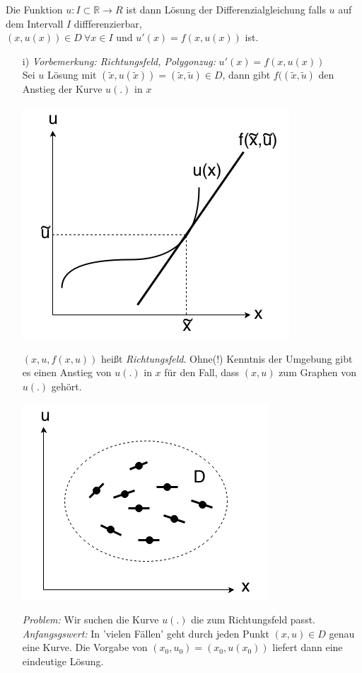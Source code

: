 Die Funktion $u: I \subset \mathbb{R} \rightarrow R $ ist dann Lösung der Differenzialgleichung falls
$u$ auf dem Intervall $I$ diffferenzierbar,\\
$(x, u(x)) \in D \ \forall x \in I $ und $u'(x) = f(x, u(x)) $ ist.\newpage
\begin{enumerate}
    \item[i)] \emph{Vorbemerkung: Richtungsfeld, Polygonzug:} $u'(x) = f(x, u(x))$\\
        Sei $u$ Lösung mit $(\tilde{x}, u(\tilde{x})) = (\tilde{x}, \tilde{u}) \in D$, dann gibt $f((\tilde{x}, \tilde{u}) $ den Anstieg der Kurve $u(.) $ in $x$
\begin{center}
    \includegraphics[scale=0.5]{pictures/011-04.png}
\end{center}
$(x, u, f(x,u)) $ heißt \emph{Richtungsfeld}. 
Ohne(!) Kenntnis der Umgebung gibt es einen Anstieg 
von $u(.)$ in $x$ für den Fall, dass $(x,u) $ zum 
Graphen von $u(.) $ gehört.
\begin{center}
\includegraphics[scale=0.5]{pictures/011-05.png}
\end{center}
\emph{Problem:} Wir suchen die Kurve $u(.) $ die zum Richtungsfeld passt.\\
\emph{Anfangsgswert:} In 'vielen Fällen' geht durch jeden Punkt $(x,u) \in D $
        genau eine Kurve. Die Vorgabe 
        von $(x_0, u_0) = (x_0, u(x_0)) $ 
        liefert dann eine eindeutige Lösung.\\
        

\end{enumerate}
